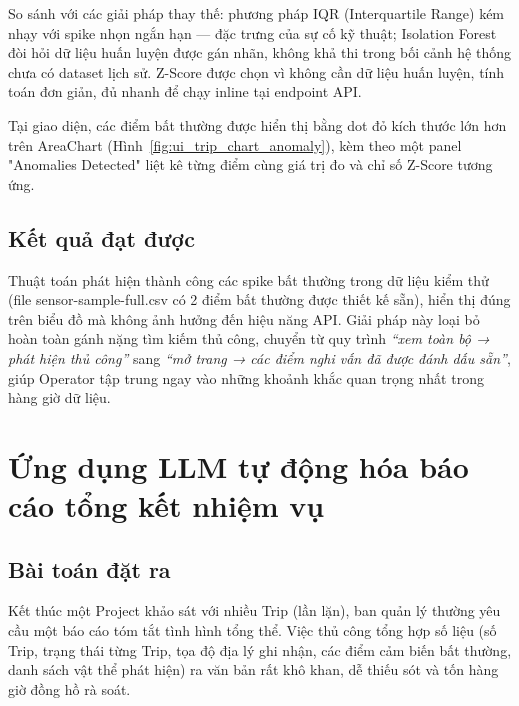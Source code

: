 \documentclass[../DoAn.tex]{subfiles}
\begin{document}
So sánh với các giải pháp thay thế: phương pháp IQR (Interquartile Range) kém nhạy với spike nhọn ngắn hạn — đặc trưng của sự cố kỹ thuật; Isolation Forest đòi hỏi dữ liệu huấn luyện được gán nhãn, không khả thi trong bối cảnh hệ thống chưa có dataset lịch sử. Z-Score được chọn vì không cần dữ liệu huấn luyện, tính toán đơn giản, đủ nhanh để chạy inline tại endpoint API.

Tại giao diện, các điểm bất thường được hiển thị bằng dot đỏ kích thước lớn hơn trên AreaChart (Hình~\ref{fig:ui_trip_chart_anomaly}), kèm theo một panel "Anomalies Detected" liệt kê từng điểm cùng giá trị đo và chỉ số Z-Score tương ứng.

\subsection{Kết quả đạt được}
Thuật toán phát hiện thành công các spike bất thường trong dữ liệu kiểm thử (file sensor-sample-full.csv có 2 điểm bất thường được thiết kế sẵn), hiển thị đúng trên biểu đồ mà không ảnh hưởng đến hiệu năng API. Giải pháp này loại bỏ hoàn toàn gánh nặng tìm kiếm thủ công, chuyển từ quy trình \textit{``xem toàn bộ → phát hiện thủ công''} sang \textit{``mở trang → các điểm nghi vấn đã được đánh dấu sẵn''}, giúp Operator tập trung ngay vào những khoảnh khắc quan trọng nhất trong hàng giờ dữ liệu.

\section{Ứng dụng LLM tự động hóa báo cáo tổng kết nhiệm vụ}
\label{section:5.5}
\subsection{Bài toán đặt ra}
Kết thúc một Project khảo sát với nhiều Trip (lần lặn), ban quản lý thường yêu cầu một báo cáo tóm tắt tình hình tổng thể. Việc thủ công tổng hợp số liệu (số Trip, trạng thái từng Trip, tọa độ địa lý ghi nhận, các điểm cảm biến bất thường, danh sách vật thể phát hiện) ra văn bản rất khô khan, dễ thiếu sót và tốn hàng giờ đồng hồ rà soát.
\end{document}
